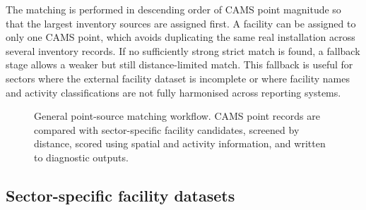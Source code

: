 The matching is performed in descending order of CAMS point magnitude so
that the largest inventory sources are assigned first. A facility can be
assigned to only one CAMS point, which avoids duplicating the same real
installation across several inventory records. If no sufficiently strong
strict match is found, a fallback stage allows a weaker but still
distance-limited match. This fallback is useful for sectors where the
external facility dataset is incomplete or where facility names and
activity classifications are not fully harmonised across reporting
systems.

\begin{figure}[htbp]
  \centering
  \caption{General point-source matching workflow. CAMS point records are compared with sector-specific facility candidates, screened by distance, scored using spatial and activity information, and written to diagnostic outputs.}
  \label{fig:point-source-matching-workflow}
\end{figure}

\subsection{Sector-specific facility datasets}

